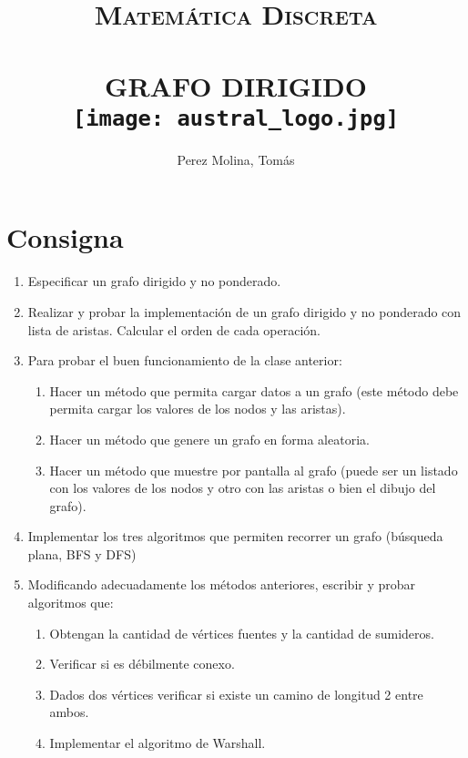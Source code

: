 \documentclass[a4paper,10pt]{extarticle}
\title{	\large \textsc{Matemática Discreta} 	%
		 	\\[2.0cm]								%
			\HRule{0.5pt} \\						%
			\LARGE \textbf{\uppercase{Grafo Dirigido}}	%
			\HRule{2pt} \\ [0.5cm]		%
      \vfill
      \texttt{[image: austral\_logo.jpg]}
}
\author{
        Perez Molina, Tomás\\
}
\makeatletter
\def\printtitle{%
    {\centering \@title\par}}
\def\printauthor{%
    {\centering \large \@author}}
\makeatother
\begin{document}
\thispagestyle{empty}		%

\printtitle					%
\vfill



\printauthor				%
\newpage



\tableofcontents
\thispagestyle{empty}
\pagebreak

\setcounter{page}{1} %

\pagebreak
\section{Consigna}
  \begin{enumerate}
    \item Especificar un grafo dirigido y no ponderado.
    \item Realizar y probar la implementación de un grafo dirigido y no ponderado con lista de aristas. Calcular el orden de cada operación.
    \item Para probar el buen funcionamiento de la clase anterior:
      \begin{enumerate}[label=(\roman*)]
        \item Hacer un método que permita cargar datos a un grafo (este método debe permita cargar los valores de los nodos y las aristas).
        \item Hacer un método que genere un grafo en forma aleatoria.
        \item Hacer un método que muestre por pantalla al grafo (puede ser un listado con los valores de los nodos y otro con las aristas o bien el dibujo del grafo).
      \end{enumerate}
    \item Implementar los tres algoritmos que permiten recorrer un grafo (búsqueda plana, BFS y DFS)
    \item Modificando adecuadamente los métodos anteriores, escribir y probar algoritmos que:
      \begin{enumerate}[label=(\roman*)]
        \item Obtengan la cantidad de vértices fuentes y la cantidad de sumideros.
        \item Verificar si es débilmente conexo.
        \item Dados dos vértices verificar si existe un camino de longitud 2 entre ambos.
        \item Implementar el algoritmo de Warshall.
      \end{enumerate}
  \end{enumerate}
\end{document}
